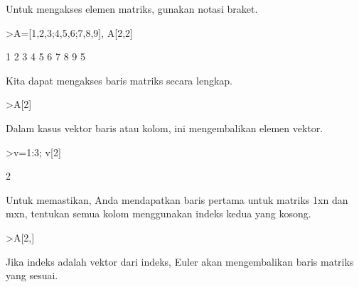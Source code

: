 \documentclass[a4paper,10pt]{article}
\begin{document}
\begin{eulernotebook}
\begin{eulercomment}
\begin{eulercomment}
\begin{eulercomment}
\begin{eulercomment}
\begin{eulercomment}
\begin{eulercomment}
\begin{eulercomment}
\begin{eulercomment}
\begin{euleroutput}
  [1,  2,  3,  4,  5,  6,  7,  8,  9]
\end{euleroutput}
\begin{eulercomment}
Untuk mengakses elemen matriks, gunakan notasi braket.
\end{eulercomment}
\begin{eulerprompt}
>A=[1,2,3;4,5,6;7,8,9], A[2,2]
\end{eulerprompt}
\begin{euleroutput}
              1             2             3 
              4             5             6 
              7             8             9 
  5
\end{euleroutput}
\begin{eulercomment}
Kita dapat mengakses baris matriks secara lengkap.
\end{eulercomment}
\begin{eulerprompt}
>A[2]
\end{eulerprompt}
\begin{euleroutput}
  [4,  5,  6]
\end{euleroutput}
\begin{eulercomment}
Dalam kasus vektor baris atau kolom, ini mengembalikan elemen vektor.
\end{eulercomment}
\begin{eulerprompt}
>v=1:3; v[2]
\end{eulerprompt}
\begin{euleroutput}
  2
\end{euleroutput}
\begin{eulercomment}
Untuk memastikan, Anda mendapatkan baris pertama untuk matriks 1xn dan
mxn, tentukan semua kolom menggunakan indeks kedua yang kosong.
\end{eulercomment}
\begin{eulerprompt}
>A[2,]
\end{eulerprompt}
\begin{euleroutput}
  [4,  5,  6]
\end{euleroutput}
\begin{eulercomment}
Jika indeks adalah vektor dari indeks, Euler akan mengembalikan baris
matriks yang sesuai.


\end{eulercomment}
\end{eulercomment}
\end{eulercomment}
\end{eulercomment}
\end{eulercomment}
\end{eulercomment}
\end{eulercomment}
\end{eulercomment}
\end{eulercomment}
\end{eulernotebook}
\end{document}
